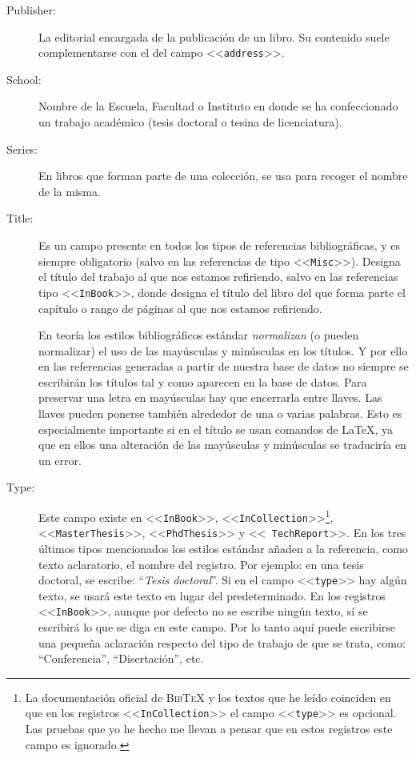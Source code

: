 \documentclass[a4paper,11pt]{article}
\def\btx-{\textsc{Bib\TeX}}
\def\ltx-{\LaTeX}
\def\ltr#1-{<<\texttt{#1}>>}
\begin{document}
\begin{description}
\item[Publisher:] La  editorial encargada de  la publicación de un  libro.  Su
  contenido suele complementarse con el del campo \ltr address-.

\item[School:]  Nombre de  la Escuela,  Facultad o  Instituto en  donde  se ha
  confeccionado   un   trabajo  académico   (tesis   doctoral   o  tesina   de
  licenciatura).

\item[Series:]  En libros  que  forman parte  de  una colección,  se usa  para
  recoger el nombre de la misma.

\item[Title:]  Es  un  campo  presente  en  todos  los  tipos  de  referencias
  bibliográficas, y es  siempre obligatorio (salvo en las  referencias de tipo
  \ltr Misc-).  Designa  el título del trabajo al  que nos estamos refiriendo,
  salvo  en las referencias  tipo \ltr  InBook-, donde  designa el  título del
  libro del que forma parte el capítulo  o rango de páginas al que nos estamos
  refiriendo.

  En teoría  los estilos  bibliográficos estándar \emph{normalizan}  (o pueden
  normalizar) el uso de las mayúsculas y minúsculas en los títulos. Y por ello
  en las referencias generadas a partir de nuestra base de datos no siempre se
  escribirán  los títulos  tal y  como  aparecen en  la base  de datos.   Para
  preservar  una letra  en mayúsculas  hay que  encerrarla entre  llaves.  Las
  llaves pueden  ponerse también alrededor de  una o varias  palabras. Esto es
  especialmente importante si  en el título se usan comandos  de \ltx-, ya que
  en ellos una  alteración de las mayúsculas y minúsculas  se traduciría en un
  error.

\item[Type:] Este campo existe en \ltr InBook-, \ltr InCollection-\footnote{La
    documentación oficial de \btx- y los  textos que he leído coinciden en que
    en los registros  \ltr InCollection- el campo \ltr  type- es opcional. Las
    pruebas que  yo he hecho  me llevan a  pensar que en estos  registros este
    campo  es  ignorado.   },  \ltr  MasterThesis-,  \ltr  PhdThesis-  y  \ltr
  TechReport-.   En los tres  últimos tipos  mencionados los  estilos estándar
  añaden a la referencia, como  texto aclaratorio, el nombre del registro. Por
  ejemplo: en una tesis doctoral, se escribe: ``\emph{Tesis doctoral}''. Si en
  el  campo \ltr  type- hay  algún texto,  se usará  este texto  en  lugar del
  predeterminado.  En  los registros  \ltr InBook-, aunque  por defecto  no se
  escribe ningún texto, sí  se escribirá lo que se diga en  este campo. Por lo
  tanto  aquí puede  escribirse una  pequeña aclaración  respecto del  tipo de
  trabajo de que se trata, como: ``Conferencia'', ``Disertación'', etc.


\end{description}
\end{document}
